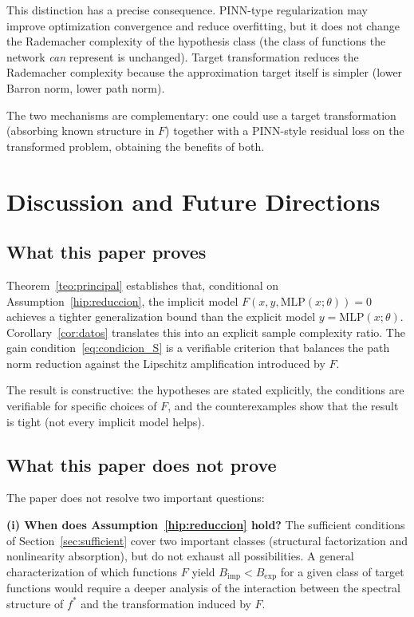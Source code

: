 \documentclass[12pt]{article}
\newcommand{\MLP}{\mathrm{MLP}}
\begin{document}
This distinction has a precise consequence.
PINN-type regularization may improve optimization convergence and
reduce overfitting, but it does not change the Rademacher complexity
of the hypothesis class (the class of functions the network
\emph{can} represent is unchanged).
Target transformation reduces the Rademacher complexity because the
approximation target itself is simpler (lower Barron norm, lower path
norm).

The two mechanisms are complementary: one could use a target
transformation (absorbing known structure in $F$) together with a
PINN-style residual loss on the transformed problem, obtaining the
benefits of both.

\section{Discussion and Future Directions}
\label{sec:discussion}

\subsection{What this paper proves}

Theorem~\ref{teo:principal} establishes that, conditional on
Assumption~\ref{hip:reduccion}, the implicit model
$F(x, y, \MLP(x;\theta)) = 0$ achieves a tighter generalization
bound than the explicit model $y = \MLP(x;\theta)$.
Corollary~\ref{cor:datos} translates this into an explicit sample
complexity ratio.
The gain condition~\eqref{eq:condicion_S} is a verifiable criterion
that balances the path norm reduction against the Lipschitz
amplification introduced by $F$.

The result is constructive: the hypotheses are stated explicitly,
the conditions are verifiable for specific choices of $F$, and the
counterexamples show that the result is tight (not every implicit
model helps).

\subsection{What this paper does not prove}

The paper does not resolve two important questions:

\textbf{(i) When does Assumption~\ref{hip:reduccion} hold?}
The sufficient conditions of Section~\ref{sec:sufficient} cover
two important classes (structural factorization and nonlinearity
absorption), but do not exhaust all possibilities.
A general characterization of which functions $F$ yield
$B_{\mathrm{imp}} < B_{\mathrm{exp}}$ for a given class of target
functions would require a deeper analysis of the interaction between
the spectral structure of $f^*$ and the transformation induced
by $F$.
\end{document}
